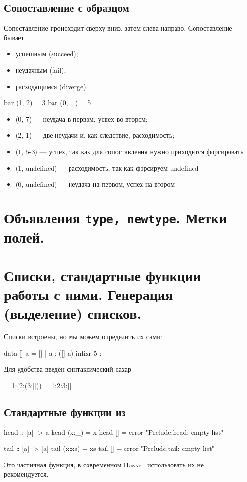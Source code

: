 \documentclass[11pt,a4paper]{article}
\begin{document}
\subsection{Сопоставление с образцом}
Сопоставление происходит сверху вниз, затем слева направо.
Сопоставление бывает
\begin{itemize}
	\item
успешным (succeed);
\item 
неудачным (fail);
\item
расходящимся (diverge).
\end{itemize}
\begin{hscode}
bar (1, 2) = 3
bar (0, _) = 5
\end{hscode}
\begin{itemize}[noitemsep]
	\item(0, 7) --- неудача в первом, успех во втором;
	\item(2, 1) --- две неудачи и, как следствие, расходимость;
	\item(1, 5-3) --- успех, так как для сопоставления нужно приходится форсировать
	\item(1, undefined) --- расходимость, так как форсируем undefined 
	\item(0, undefined) --- неудача на первом, успех на втором
\end{itemize}


\section{Объявления \texttt{type, newtype}. Метки полей.}


\section{Списки, стандартные функции работы с ними. Генерация (выделение) списков.}
Списки встроены, но мы можем определить их сами:
\begin{hscode}
data [] a = [] | a : ([] a)
infixr 5 :
\end{hscode}
Для удобства введён синтаксический сахар
\begin{hscode}
[1,2,3] = 1:(2:(3:[])) = 1:2:3:[]
\end{hscode}
\subsection{Стандартные функции из }

\begin{hscode}
head :: [a] -> a
head (x:_) = x
head [] = error "Prelude.head: empty list"

tail :: [a] -> [a]
tail (x:xs) = xs
tail [] = error "Prelude.tail: empty list"
\end{hscode}
Это частичная функция, в современном Haskell использовать
их не рекомендуется.
\end{document}
